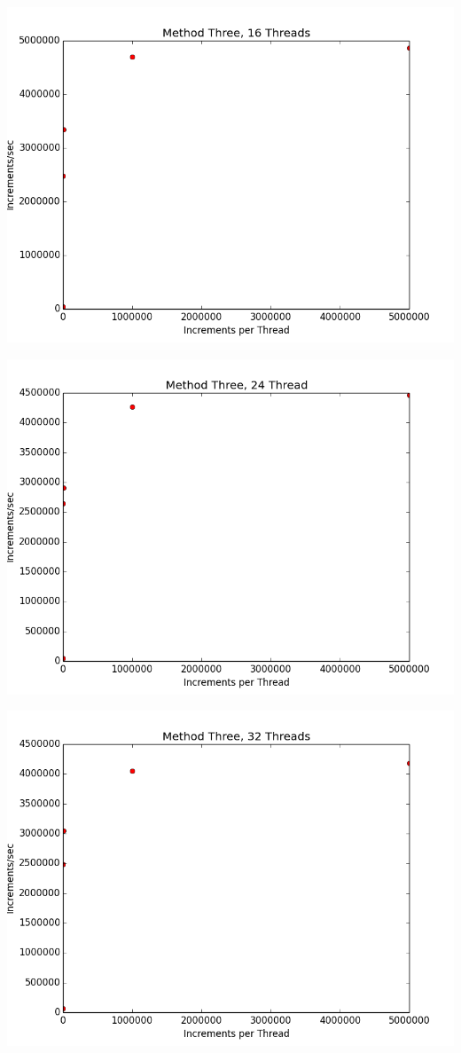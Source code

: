 \documentclass[12pt]{article}
\begin{document}
\includegraphics[scale=.5]{Graphs/MethodThree_16Thread.png}

\includegraphics[scale=.5]{Graphs/MethodThree_24Thread.png}

\includegraphics[scale=.5]{Graphs/MethodThree_32Thread.png}
\end{document}
